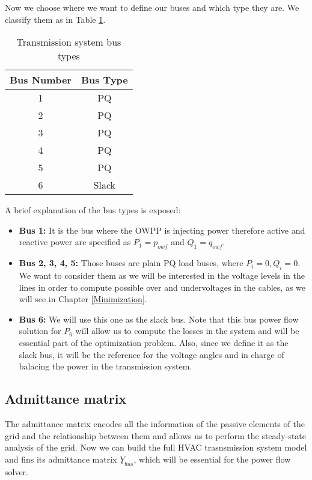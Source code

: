 \documentclass[a4paper,11pt, titlepage, twoside]{article}
\begin{document}
Now we choose where we want to define our buses and which type they are. We classify them as in Table \ref{table:bus_types}.
\begin{table}[h]
\centering
\begin{tabular}{c|c}
\hline
\textbf{Bus Number} & \textbf{Bus Type} \\
\hline
1 & PQ \\
2 & PQ \\
3 & PQ \\
4 & PQ \\
5 & PQ \\
6 & Slack \\
\hline
\end{tabular}
\caption{ Transmission system bus types}
\label{table:bus_types}
\end{table}

A brief explanation of the bus types is exposed:
\begin{itemize}
    \item \textbf{Bus 1:} It is the bus where the OWPP is injecting power therefore active and reactive power are specified as $P_1=p_{owf}$ and $Q_1=q_{owf}$.
    \item \textbf{Bus 2, 3, 4, 5:} Those buses are plain  PQ load buses, where $P_i=0, Q_i=0$. We want to consider them as we will be interested in the voltage levels in the lines in order
    to compute possible over and undervoltages in the cables, as we will see in Chapter \ref{Minimization}.
    \item \textbf{Bus 6:} We will use this one as the slack bus. Note that this bus power flow solution for $P_6$ will allow us to compute the losses in the system
    and will be essential part of the optimization problem. Also, since we define it as the slack bus, it will be the reference for the voltage angles and in charge of balacing the power in the transmission system. 
\end{itemize}
\subsection{Admittance matrix}

The admittance matrix encodes all the information of the passive elements of the grid and the relationship between them and allows us to perform the steady-state 
analysis of the grid.
Now we can build the full HVAC trasnsmission system model and fins its admittance matrix $\underline{Y}_{bus}$, which will be essential
for the power flow solver.
\end{document}
